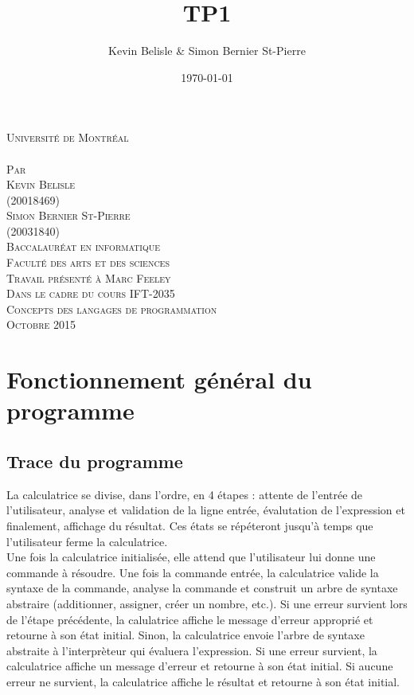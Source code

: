 \documentclass[a4paper,12pt,french]{article}
\date{\today}
\author{Kevin Belisle \& Simon Bernier St-Pierre}
\title{TP1}
\newcommand{\Teacher}{Marc Feeley}
\newcommand{\ClassNum}{IFT-2035}
\newcommand{\ClassName}{Concepts des langages de programmation}
\newcommand{\DateMMMMYYYY}{Octobre 2015}
\newcommand{\Author}{Kevin Belisle}
\newcommand{\Authorr}{Simon Bernier St-Pierre}
\begin{document}
\begin{titlepage}
	\begin{center}
		\textsc{\normalsize Université de Montréal}\\[2.5cm]

		\textsc{\LARGE \@title}\\[2.5cm]

		\textsc{\small Par}\\[0.25cm]
		\textsc{\LARGE \Author}\\[0.25cm]
		\textsc{\normalsize (20018469)}\\[0.25cm]
		\textsc{\LARGE \Authorr}\\[0.25cm]
		\textsc{\normalsize (20031840)}\\[2.5cm]

		\textsc{\normalsize Baccalauréat en informatique}\\
		\textsc{\normalsize Faculté des arts et des sciences}\\[2.5cm]

		\textsc{\small Travail présenté à \Teacher}\\
		\textsc{\small Dans le cadre du cours \ClassNum}\\
		\textsc{\small \ClassName}\\[2.5cm]

		\textsc{\normalsize \DateMMMMYYYY}\\[1.5cm]
	\end{center}
\end{titlepage}
\section{Fonctionnement général du programme}
	\subsection{Trace du programme}
	La calculatrice se divise, dans l'ordre, en 4 étapes : attente de l'entrée de l'utilisateur, analyse et validation de la ligne entrée, évalutation de l'expression et finalement, affichage du résultat. Ces états se répéteront jusqu'à temps que l'utilisateur ferme la calculatrice.\\

	Une fois la calculatrice initialisée, elle attend que l'utilisateur lui donne une commande à résoudre. Une fois la commande entrée, la calculatrice valide la syntaxe de la commande, analyse la commande et construit un arbre de syntaxe abstraire (additionner,  assigner, créer un nombre, etc.). Si une erreur survient lors de l'étape précédente, la calulatrice affiche le message d'erreur approprié et retourne à son état initial. Sinon, la calculatrice envoie l'arbre de syntaxe abstraite à l'interprèteur qui évaluera l'expression. Si une erreur survient, la calculatrice affiche un message d'erreur et retourne à son état initial. Si aucune erreur ne survient, la calculatrice affiche le résultat et retourne à son état initial.
\end{document}

